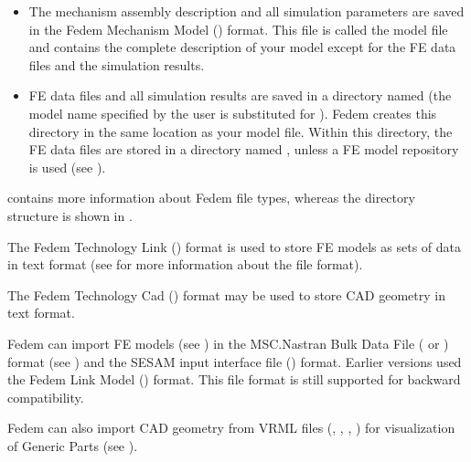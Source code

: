 \begin{itemize}
\item The mechanism assembly description and all simulation parameters
  are saved in the Fedem Mechanism Model () format.
  This file is called the model file and contains the complete description
  of your model except for the FE data files and the simulation results.
\item FE data files and all simulation results are saved in a directory named
   (the model name specified by the user
  is substituted for ).
  Fedem creates this directory in the same location as your model file.
  Within this directory, the FE data files are stored in a directory named
  , unless a FE model repository is used
  (see ).
\end{itemize}

 contains more
information about Fedem file types, whereas the directory structure is shown in
.



The Fedem Technology Link () format is used to store
FE models as sets of data in text format
(see 
for more information about the  file format).



The Fedem Technology Cad () format may be used to store CAD
geometry in text format.



Fedem can import FE models
(see )
in the MSC.Nastran Bulk Data File ( or ) format
(see )
and the SESAM input interface file () format.
Earlier versions used the Fedem Link Model () format.
This file format is still supported for backward compatibility.

Fedem can also import CAD geometry from VRML files (, ,
, ) for visualization of Generic Parts
(see ).


